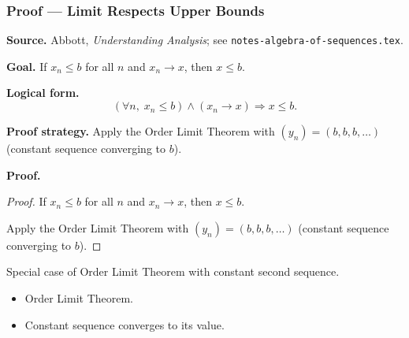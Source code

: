 
\clearpage
{}
\hypertarget{proof-RA-ABB-C-limit-upper-bound}{}

\subsubsection[Limit Respects Upper Bounds]{Proof --- Limit Respects Upper Bounds}

\bigskip

\noindent
\textbf{Source.}
Abbott, \emph{Understanding Analysis}; see \texttt{notes-algebra-of-sequences.tex}.

\vspace{0.75em}

\noindent
\textbf{Goal.}
If $x_n \le b$ for all $n$ and $x_n \to x$, then $x \le b$.

\vspace{0.75em}

\noindent
\textbf{Logical form.}
\[
  (\forall n,\; x_n \le b) \wedge (x_n \to x) \Rightarrow x \le b.
\]

\vspace{0.75em}

\noindent
\textbf{Proof strategy.}
Apply the Order Limit Theorem with $(y_n) = (b, b, b, \ldots)$ (constant sequence converging to $b$).

\vspace{0.75em}

\noindent
\textbf{Proof.}
\begin{proof}
\Claim If $x_n \le b$ for all $n$ and $x_n \to x$, then $x \le b$.

\Given 

\Goal 

\Strategy Apply the Order Limit Theorem with $(y_n) = (b, b, b, \ldots)$ (constant sequence converging to $b$).

\medskip


\end{proof}

\begin{remark*}
Special case of Order Limit Theorem with constant second sequence.
\end{remark*}

\begin{remark*}[Dependencies]
\begin{itemize}
  \item Order Limit Theorem.
  \item Constant sequence converges to its value.
\end{itemize}
\end{remark*}
